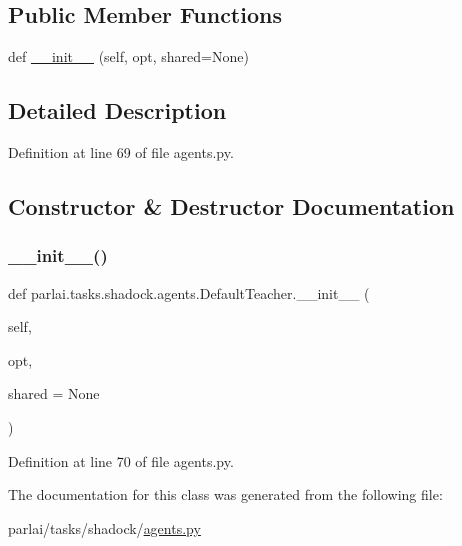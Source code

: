 \subsection*{Public Member Functions}
\begin{DoxyCompactItemize}
\item 
def \hyperlink{classparlai_1_1tasks_1_1shadock_1_1agents_1_1DefaultTeacher_ac3629b5cf2040dcb6172c276328a3b45}{\+\_\+\+\_\+init\+\_\+\+\_\+} (self, opt, shared=None)
\end{DoxyCompactItemize}


\subsection{Detailed Description}


Definition at line 69 of file agents.\+py.



\subsection{Constructor \& Destructor Documentation}
\mbox{\label{classparlai_1_1tasks_1_1shadock_1_1agents_1_1DefaultTeacher_ac3629b5cf2040dcb6172c276328a3b45}} 
\subsubsection{\texorpdfstring{\+\_\+\+\_\+init\+\_\+\+\_\+()}{\_\_init\_\_()}}
{\footnotesize\ttfamily def parlai.\+tasks.\+shadock.\+agents.\+Default\+Teacher.\+\_\+\+\_\+init\+\_\+\+\_\+ (\begin{DoxyParamCaption}\item[{}]{self,  }\item[{}]{opt,  }\item[{}]{shared = {\ttfamily None} }\end{DoxyParamCaption})}



Definition at line 70 of file agents.\+py.




The documentation for this class was generated from the following file\+:\begin{DoxyCompactItemize}
\item 
parlai/tasks/shadock/\hyperlink{parlai_2tasks_2shadock_2agents_8py}{agents.\+py}\end{DoxyCompactItemize}
